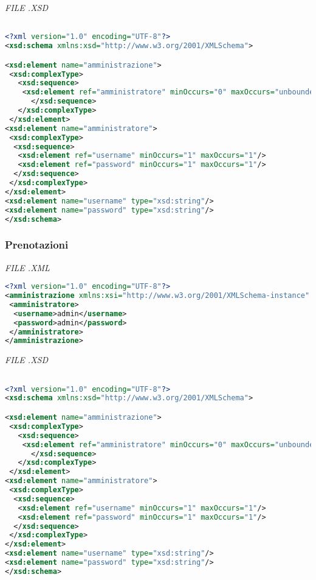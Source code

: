\documentclass [a4paper,11pt]{book}
\begin{document}
\emph{FILE .XSD}

\begin{lstlisting}[language=XML]

<?xml version="1.0" encoding="UTF-8"?>
<xsd:schema xmlns:xsd="http://www.w3.org/2001/XMLSchema">

<xsd:element name="amministrazione">
 <xsd:complexType>
   <xsd:sequence>
    <xsd:element ref="amministratore" minOccurs="0" maxOccurs="unbounded" />
      </xsd:sequence>
   </xsd:complexType>
 </xsd:element>
<xsd:element name="amministratore">
 <xsd:complexType>
  <xsd:sequence>
   <xsd:element ref="username" minOccurs="1" maxOccurs="1"/>
   <xsd:element ref="password" minOccurs="1" maxOccurs="1"/>
  </xsd:sequence>
 </xsd:complexType>
</xsd:element>
<xsd:element name="username" type="xsd:string"/>
<xsd:element name="password" type="xsd:string"/>
</xsd:schema>
\end{lstlisting}

\medskip

\subsubsection{Prenotazioni}

\emph{FILE .XML}

\begin{lstlisting}[language=XML]
<?xml version="1.0" encoding="UTF-8"?>
<amministrazione xmlns:xsi="http://www.w3.org/2001/XMLSchema-instance" xsi:noNamespaceSchemaLocation="amministrazione.xsd">
 <amministratore>
  <username>admin</username>
  <password>admin</password>
 </amministratore>
</amministrazione>
\end{lstlisting}

\emph{FILE .XSD}

\begin{lstlisting}[language=XML]

<?xml version="1.0" encoding="UTF-8"?>
<xsd:schema xmlns:xsd="http://www.w3.org/2001/XMLSchema">

<xsd:element name="amministrazione">
 <xsd:complexType>
   <xsd:sequence>
    <xsd:element ref="amministratore" minOccurs="0" maxOccurs="unbounded" />
      </xsd:sequence>
   </xsd:complexType>
 </xsd:element>
<xsd:element name="amministratore">
 <xsd:complexType>
  <xsd:sequence>
   <xsd:element ref="username" minOccurs="1" maxOccurs="1"/>
   <xsd:element ref="password" minOccurs="1" maxOccurs="1"/>
  </xsd:sequence>
 </xsd:complexType>
</xsd:element>
<xsd:element name="username" type="xsd:string"/>
<xsd:element name="password" type="xsd:string"/>
</xsd:schema>
\end{lstlisting}
\end{document}
